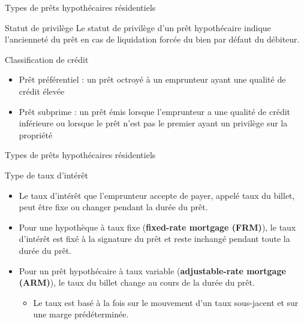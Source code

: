 \documentclass{beamer}
\begin{document}
\begin{frame}{Types de prêts hypothécaires résidentiels}
\begin{block}{Statut de privilège}
Le statut de privilège d’un prêt hypothécaire indique l’ancienneté du prêt en cas de liquidation forcée du bien par défaut du débiteur.
\end{block}
\begin{block}{Classification de crédit}
\begin{itemize}[label=\bullet]
\item Prêt préférentiel : un prêt octroyé à un emprunteur ayant une qualité de crédit élevée 
\item Prêt subprime : un prêt émis lorsque l'emprunteur a une qualité de crédit inférieure ou lorsque le prêt n'est pas le premier ayant un privilège sur la propriété
\end{itemize}
\end{block}
\end{frame}

\begin{frame}{Types de prêts hypothécaires résidentiels}
\begin{block}{Type de taux d'intérêt}
\begin{itemize}[label=\bullet]
\item Le taux d'intérêt que l'emprunteur accepte de payer, appelé taux du billet, peut être fixe ou changer pendant la durée du prêt.
\item Pour une hypothèque à taux fixe (\textbf{fixed-rate mortgage (FRM)}), le taux d'intérêt est fixé à la signature du prêt et reste inchangé pendant toute la durée du prêt.
\item Pour un prêt hypothécaire à taux variable (\textbf{adjustable-rate mortgage (ARM)}),  le taux du billet change au cours de la durée du prêt.
\begin{itemize}[label=\bullet]
\item Le taux est basé à la fois sur le mouvement d'un taux sous-jacent et sur une marge prédéterminée.
\end{itemize}
\end{itemize}
\end{block}
\end{frame}
\end{document}
